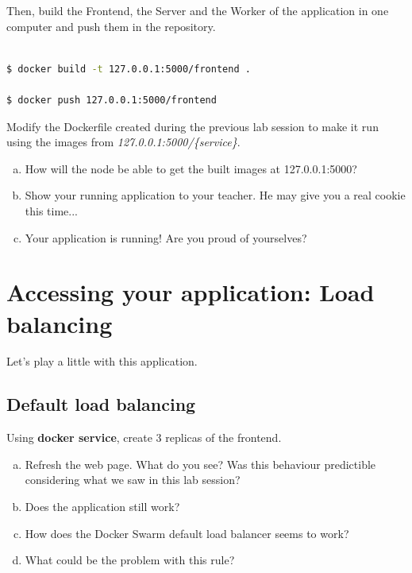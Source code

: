 \documentclass[a4paper,11pt]{exam}
\begin{document}
Then, build the Frontend, the Server and the Worker of the application in one computer and push them in the repository.

\begin{lstlisting}[frame=single,language={sh}]  % Start your code-block

$ docker build -t 127.0.0.1:5000/frontend .

$ docker push 127.0.0.1:5000/frontend
\end{lstlisting}

Modify the Dockerfile created during the previous lab session to make it run using the images from \textit{127.0.0.1:5000/\{service\}}.

\begin{questions}
	\question 
	\begin{enumerate}[(a)]
		\item How will the node be able to get the built images at 127.0.0.1:5000?
		\item Show your running application to your teacher. He may give you a real cookie this time...
		\item Your application is running! Are you proud of yourselves?
	\end{enumerate}
\end{questions}

\section{Accessing your application: Load balancing}

Let's play a little with this application. 
\subsection{Default load balancing}
\begin{questions}
	\question Using \textbf{docker service}, create 3 replicas of the frontend.
	\begin{enumerate}[(a)]
		\item Refresh the web page. What do you see? Was this behaviour predictible considering what we saw in this lab session?
		\item Does the application still work?
		\item How does the Docker Swarm default load balancer seems to work?
		\item What could be the problem with this rule?
	\end{enumerate}
\end{questions}
\end{document}
